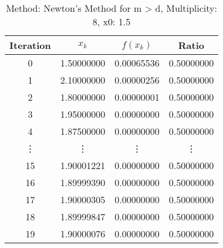 \begin{table}
\centering
\caption{Method: Newton's Method for m > d, Multiplicity: 8, x0: 1.5}
\label{tab:table_Newton's_Method_for_m_>_d_8_1_5}
\begin{tabular}{c c c c}
\toprule
Iteration &      $x_k$ &   $f(x_k)$ &      Ratio \\
\midrule
        0 & 1.50000000 & 0.00065536 & 0.50000000 \\
        1 & 2.10000000 & 0.00000256 & 0.50000000 \\
        2 & 1.80000000 & 0.00000001 & 0.50000000 \\
        3 & 1.95000000 & 0.00000000 & 0.50000000 \\
        4 & 1.87500000 & 0.00000000 & 0.50000000 \\
   \vdots &     \vdots &     \vdots &     \vdots \\
       15 & 1.90001221 & 0.00000000 & 0.50000000 \\
       16 & 1.89999390 & 0.00000000 & 0.50000000 \\
       17 & 1.90000305 & 0.00000000 & 0.50000000 \\
       18 & 1.89999847 & 0.00000000 & 0.50000000 \\
       19 & 1.90000076 & 0.00000000 & 0.50000000 \\
\bottomrule
\end{tabular}
\end{table}
